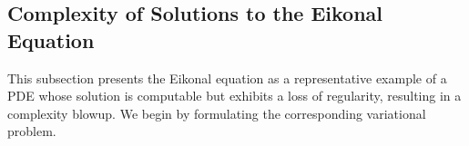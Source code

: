 \documentclass[pdflatex]{sn-jnl}%
\newtheorem{theorem}{Theorem}[section]%
\newtheorem{definition}[theorem]{Definition}
\begin{document}
\subsection{Complexity of Solutions to the Eikonal Equation}
This subsection presents the Eikonal equation \cite{Alimov2019-np} as a representative example of a PDE whose solution is computable but exhibits a loss of regularity, resulting in a complexity blowup. We begin by formulating the corresponding variational problem.
\end{document}
